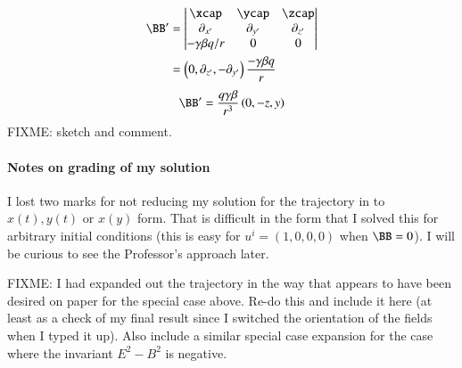 {%
\begin{equation}\label{eqn:relElectroDynProblemSet2:1270}
\begin{aligned}
\BB'
&=
\begin{vmatrix}
\xcap & \ycap & \zcap \\
\partial_{x'} & \partial_{y'} & \partial_{z'} \\
-\gamma \beta q/r & 0 & 0
\end{vmatrix} \\
&=
\left( 0, \partial_{z'}, -\partial_{y'} \right) \frac{-\gamma \beta q}{r} \\
\end{aligned}
\end{equation}
%
\begin{equation}\label{eqn:relElectroDynProblemSet2:1090}
\BB'
=
\frac{q \gamma \beta}{r^3} \left( 0, -z, y \right)
\end{equation}
%
FIXME: sketch and comment.
%
\paragraph{Notes on grading of my solution}
%
I lost two marks for not reducing my solution for the trajectory in  to \(x(t), y(t)\) or \(x(y)\) form.  That is difficult in the form that I solved this for arbitrary initial conditions (this is easy for \(u^i = (1, 0, 0, 0)\) when \(\BB = 0\)).  I will be curious to see the Professor's approach later.

FIXME: I had expanded out the trajectory in the way that appears to have been desired on paper for the special case above.  Re-do this and include it here (at least as a check of my final result since I switched the orientation of the fields when I typed it up).  Also include a similar special case expansion for the case where the invariant \(E^2 - B^2\) is negative.

}



